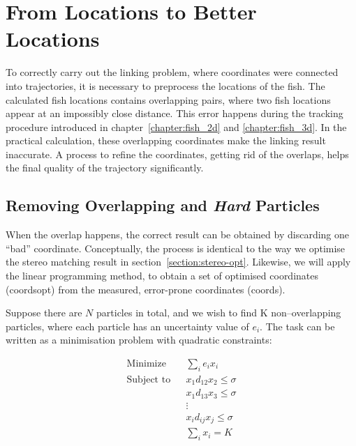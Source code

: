\documentclass[11pt,twoside]{report}
\begin{document}
\section{From Locations to Better Locations}

To correctly carry out the linking problem, where coordinates were connected into trajectories, it is necessary to preprocess the locations of the fish. The calculated fish locations contains overlapping pairs, where two fish locations appear at an impossibly close distance. This error happens during the tracking procedure introduced in chapter~\ref{chapter:fish_2d} and \ref{chapter:fish_3d}. In the practical calculation, these overlapping coordinates make the linking result inaccurate. A process to refine the coordinates, getting rid of the overlaps, helps the final quality of the trajectory significantly.

\subsection{Removing Overlapping and \emph{Hard} Particles}
\label{section:overlap}

When the overlap happens, the correct result can be obtained by discarding one ``bad'' coordinate. Conceptually, the process is identical to the way we optimise the stereo matching result in section~\ref{section:stereo-opt}.
Likewise, we will apply the linear programming method, to obtain a set of optimised coordinates (\gls{coordsopt}) from the measured, error-prone coordinates (\gls{coords}).

Suppose there are $N$ particles in total, and we wish to find \gls{K} non--overlapping particles, where each particle has an uncertainty value of $e_i$.
The task can be written as a minimisation problem with quadratic constraints:

\begin{equation}
\begin{aligned}
	\textrm{Minimize} && \sum_i{e_i x_i} \\
	\textrm{Subject to} &&  x_1 d_{12}  x_2 \le \sigma \\
	&&  x_1 d_{13}  x_3 \le \sigma \\
	&& \vdots  \\
	&& x_i d_{ij}  x_j \le \sigma \\
	&& \sum_i{x_i} = K
\label{eq:overlap}
\end{aligned}
\end{equation}
\end{document}
